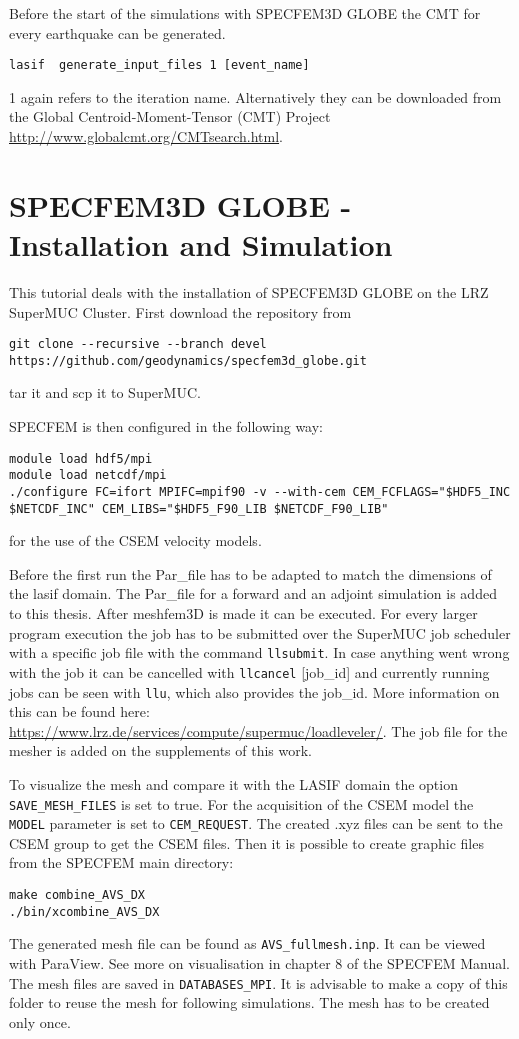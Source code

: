 Before the start of the simulations with SPECFEM3D GLOBE the CMT for every earthquake can be generated.
\begin{lstlisting} 
lasif  generate_input_files 1 [event_name]
\end{lstlisting}
1 again refers to the iteration name. 
Alternatively they can be downloaded from the Global Centroid-Moment-Tensor (CMT) Project
\url{http://www.globalcmt.org/CMTsearch.html}.


\section{SPECFEM3D GLOBE - Installation and Simulation}

This tutorial deals with the installation of SPECFEM3D GLOBE on the 
LRZ SuperMUC Cluster. 
First download the repository from
\begin{lstlisting} 
git clone --recursive --branch devel https://github.com/geodynamics/specfem3d_globe.git
\end{lstlisting}
tar it and scp it to SuperMUC.

SPECFEM is then configured in the following way:
\begin{lstlisting} 
module load hdf5/mpi
module load netcdf/mpi
./configure FC=ifort MPIFC=mpif90 -v --with-cem CEM_FCFLAGS="$HDF5_INC  $NETCDF_INC" CEM_LIBS="$HDF5_F90_LIB $NETCDF_F90_LIB"
\end{lstlisting}
for the use of the CSEM velocity models.

Before the first run the Par\_file has to be adapted  to match the 
dimensions of the lasif domain. 
The Par\_file for a forward and an adjoint simulation is added to this thesis.
After meshfem3D is made it can be executed. 
For every larger program execution the job has to be submitted over the SuperMUC
job scheduler with a specific job file with the command \texttt{llsubmit}.
In case anything went wrong with the job it can be cancelled with 
\texttt{llcancel} [job\_id] and currently running jobs can be seen with \texttt{llu}, which also provides the job\_id.
More information on this can be found here: \url{https://www.lrz.de/services/compute/supermuc/loadleveler/}.
The job file for the mesher is added on the supplements of this work.

To visualize the mesh and compare it with the LASIF domain the option 
\texttt{SAVE\_MESH\_FILES} is set to true. 
For the acquisition of the CSEM model the \texttt{MODEL} parameter is set
to \texttt{CEM\_REQUEST}. 
The created .xyz files can be sent to the CSEM group to get the CSEM files.
Then it is possible to create graphic files from the SPECFEM main directory:
\begin{lstlisting} 
make combine_AVS_DX
./bin/xcombine_AVS_DX
\end{lstlisting}
The generated mesh file can be found as \texttt{AVS\_fullmesh.inp}.
It can be viewed with ParaView.
See more on visualisation in chapter 8 of the SPECFEM Manual.
The mesh files are saved in \texttt{DATABASES\_MPI}. 
It is advisable to make a copy of this folder to reuse the mesh
for following simulations. 
The mesh has to be created only once.

